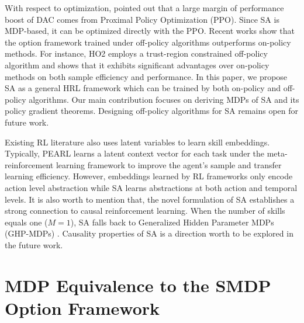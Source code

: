 With respect to optimization,  pointed out
that a large margin of performance boost of DAC comes from
Proximal Policy Optimization \cite{schulman2017proximal} (PPO).
Since SA is MDP-based, it can be optimized directly with the PPO.
Recent works show that the option framework trained under
off-policy \cite{haarnoja2018soft} algorithms outperforms
on-policy methods. For instance, HO2 \cite{wulfmeier2020data}
employs a trust-region constrained off-policy algorithm and shows
that it exhibits significant advantages over on-policy methods on
both sample efficiency and performance. In this paper, we propose
SA as a general HRL framework which can be trained by both
on-policy and off-policy algorithms. Our main contribution
focuses on deriving MDPs of SA and its policy gradient theorems.
Designing off-policy algorithms for SA remains open for future
work.

Existing RL literature
\cite{hausman2018learning,li2017infogail,tirumala2019exploiting}
also uses latent variables to learn skill embeddings. Typically,
PEARL \cite{rakelly2019efficient} learns a latent context vector
for each task under the meta-reinforcement learning framework to
improve the agent's sample and transfer learning efficiency.
However, embeddings learned by RL frameworks only encode action
level abstraction while SA learns abstractions at both action and
temporal levels. It is also worth to mention that, the novel
formulation of SA establishes a strong connection to causal
reinforcement learning. When the number of skills equals one
($M=1$), SA falls back to Generalized Hidden Parameter MDPs
(GHP-MDPs) \cite{kolobov2012discovering,perez2020generalized}.
Causality properties of SA is a direction worth to be explored in
the future work.

\section{MDP Equivalence to the SMDP Option Framework}
\label{sec:appen_oc_pgm}

